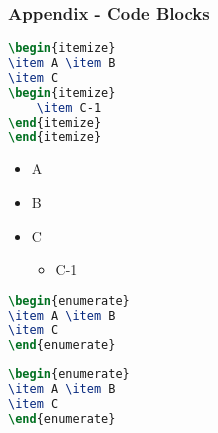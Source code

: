 \begin{frame}
\label{Code}
\frametitle{Appendix - Code Blocks}

\begin{minipage}{0.5\paperwidth}
\begin{lstlisting}[language=TeX]
\begin{itemize}
\item A \item B
\item C
\begin{itemize}
    \item C-1
\end{itemize}
\end{itemize}
\end{lstlisting}
\end{minipage}\hspace{1cm}
\begin{minipage}{0.3\paperwidth}
    \begin{itemize}
    \item A \item B
    \item C
    \begin{itemize}
        \item C-1
    \end{itemize}
    \end{itemize}
\end{minipage}\vspace{0cm}
\begin{minipage}{0.5\paperwidth}
\begin{lstlisting}[language=TeX]
\begin{enumerate}
\item A \item B
\item C
\end{enumerate}
\end{lstlisting}
\end{minipage}\hspace{1cm}
\begin{minipage}{0.5\paperwidth}
\begin{lstlisting}[language=TeX]
\begin{enumerate}
\item A \item B
\item C
\end{enumerate}
\end{lstlisting}
\end{minipage}

\hyperlink{Maths}{}
\end{frame}
